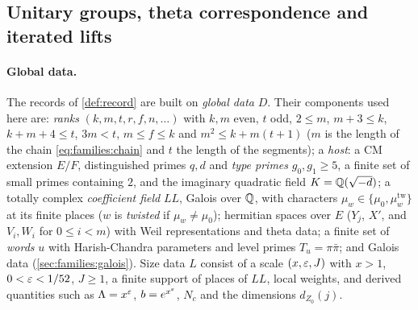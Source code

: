 \subsection{Unitary groups, theta correspondence and iterated lifts}\label{sec:families:theta}

\paragraph{Global data.}
The records of \cref{def:record} are built on \emph{global data} $D$. Their components used here are:
\emph{ranks} $(k,m,t,r,f,n,\dots)$ with $k,m$ even, $t$ odd, $2\le m$, $m+3\le k$, $k+m+4\le t$, $3m<t$,
$m\le f\le k$ and $m^2\le k+m(t+1)$ ($m$ is the length of the chain \eqref{eq:families:chain} and $t$ the length
of the segments); a \emph{host}: a CM extension $E/F$, distinguished primes $q,d$ and \emph{type primes}
$g_0,g_1\ge5$, a finite set of small primes containing $2$, and the imaginary quadratic field $K=\mathbb{Q}(\sqrt{-d})$;
a totally complex \emph{coefficient field} $\mathit{LL}$, Galois over $\mathbb{Q}$, with characters
$\mu_w\in\{\mu_0,\mu^{\mathrm{tw}}_w\}$ at its finite places ($w$ is \emph{twisted} if $\mu_w\ne\mu_0$); hermitian
spaces over $E$ ($Y_j$, $X'$, and $V_i,W_i$ for $0\le i<m$) with Weil representations and theta data; a finite
set of \emph{words} $u$ with Harish-Chandra parameters and level primes $T_u=\pi\bar\pi$; and Galois data
(\cref{sec:families:galois}). Size data $L$ consist of a scale $(x,\varepsilon,J)$ with $x>1$, $0<\varepsilon<1/52$, $J\ge1$, a
finite support of places of $\mathit{LL}$, local weights, and derived quantities such as $\Lambda=x^\varepsilon$,
$b=e^{x^\varepsilon}$, $N_c$ and the dimensions $d_{Z_0}(j)$.

